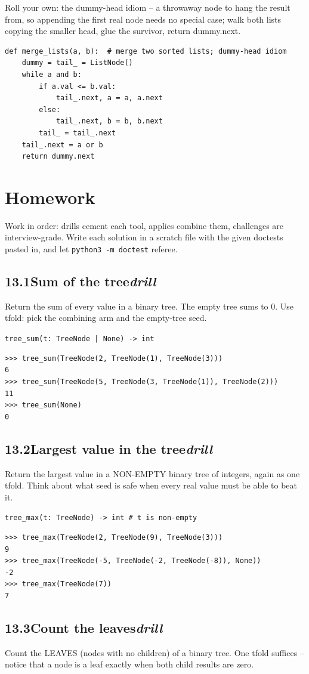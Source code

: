 \documentclass[10pt,letterpaper]{book}
\begin{document}
Roll your own: the dummy-head idiom -- a throwaway node to hang the result from, so appending the first real node needs no special case; walk both lists copying the smaller head, glue the survivor, return dummy.next.

\begin{lstlisting}[style=ex]
def merge_lists(a, b):  # merge two sorted lists; dummy-head idiom
    dummy = tail_ = ListNode()
    while a and b:
        if a.val <= b.val:
            tail_.next, a = a, a.next
        else:
            tail_.next, b = b, b.next
        tail_ = tail_.next
    tail_.next = a or b
    return dummy.next
\end{lstlisting}
\section{Homework}
Work in order: drills cement each tool, applies combine them,
challenges are interview-grade. Write each solution in a scratch file with
the given doctests pasted in, and let \texttt{python3 -m doctest} referee.
\subsection*{13.1\quad Sum of the tree\hfill\textnormal{\textit{drill}}}
Return the sum of every value in a binary tree. The empty tree sums to 0. Use tfold: pick the combining arm and the empty-tree seed.

\noindent\texttt{tree\_sum(t: TreeNode | None) -> int}
\begin{lstlisting}[style=ex]
>>> tree_sum(TreeNode(2, TreeNode(1), TreeNode(3)))
6
>>> tree_sum(TreeNode(5, TreeNode(3, TreeNode(1)), TreeNode(2)))
11
>>> tree_sum(None)
0
\end{lstlisting}
\subsection*{13.2\quad Largest value in the tree\hfill\textnormal{\textit{drill}}}
Return the largest value in a NON-EMPTY binary tree of integers, again as one tfold. Think about what seed is safe when every real value must be able to beat it.

\noindent\texttt{tree\_max(t: TreeNode) -> int   \# t is non-empty}
\begin{lstlisting}[style=ex]
>>> tree_max(TreeNode(2, TreeNode(9), TreeNode(3)))
9
>>> tree_max(TreeNode(-5, TreeNode(-2, TreeNode(-8)), None))
-2
>>> tree_max(TreeNode(7))
7
\end{lstlisting}
\subsection*{13.3\quad Count the leaves\hfill\textnormal{\textit{drill}}}
Count the LEAVES (nodes with no children) of a binary tree. One tfold suffices -- notice that a node is a leaf exactly when both child results are zero.
\end{document}
